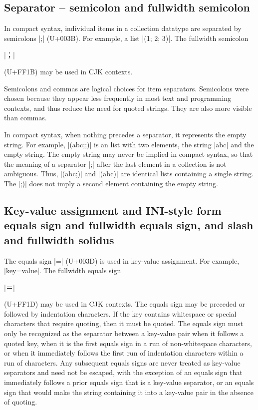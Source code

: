 \documentclass[11pt]{article}
\begin{document}
\subsection{Separator -- semicolon and fullwidth semicolon}

In compact syntax, individual items in a collection datatype are separated by semicolons |;| (U+003B).  For example, a list |(1; 2; 3)|.  The fullwidth semicolon \begin{CJK*}{UTF8}{gkai}|；|\end{CJK*} (U+FF1B) may be used in CJK contexts.

Semicolons and commas are logical choices for item separators.  Semicolons were chosen because they appear less frequently in most text and programming contexts, and thus reduce the need for quoted strings.  They are also more visible than commas.

In compact syntax, when nothing precedes a separator, it represents the empty string.  For example, |(abc;;)| is an list with two elements, the string |abc| and the empty string.  The empty string may never be implied in compact syntax, so that the meaning of a separator |;| after the last element in a collection is not ambiguous.  Thus, |(abc;)| and |(abc)| are identical lists containing a single string.  The |;)| does not imply a second element containing the empty string.


\subsection{Key-value assignment and INI-style form -- equals sign and fullwidth equals sign, and slash and fullwidth solidus}

The equals sign |=| (U+003D) is used in key-value assignment.  For example, |key=value|.  The fullwidth equals sign \begin{CJK*}{UTF8}{gkai}|＝|\end{CJK*} (U+FF1D) may be used in CJK contexts.  The equals sign may be preceded or followed by indentation characters.  If the key contains whitespace or special characters that require quoting, then it must be quoted.  The equals sign must only be recognized as the separator between a key-value pair when it follows a quoted key, when it is the first equals sign in a run of non-whitespace characters, or when it immediately follows the first run of indentation characters within a run of characters.  Any subsequent equals signs are never treated as key-value separators and need not be escaped, with the exception of an equals sign that immediately follows a prior equals sign that is a key-value separator, or an equals sign that would make the string containing it into a key-value pair in the absence of quoting.
\end{document}
